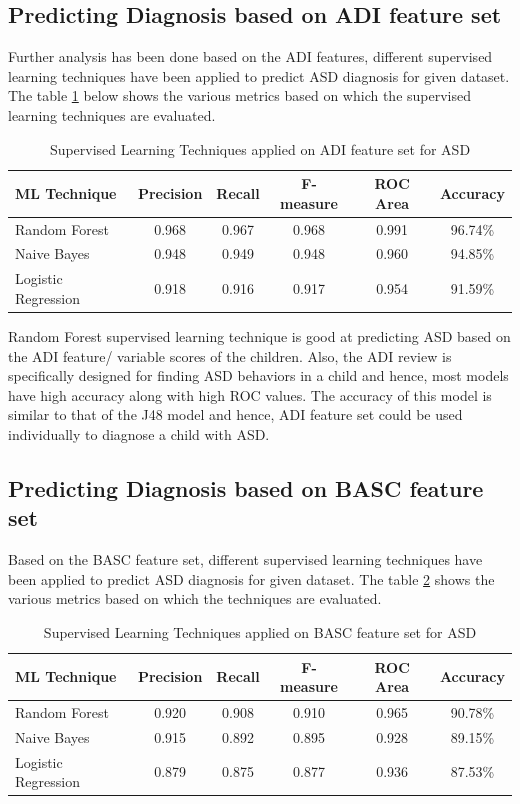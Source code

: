 \subsection{Predicting Diagnosis based on ADI feature set}
Further analysis has been done based on the ADI features, different supervised learning techniques have been applied to predict ASD diagnosis for given dataset. The table \ref{table:64} below shows the various metrics based on which the supervised learning techniques are evaluated.
\begin{table}[h]
\begin{center}
\begin{tabular}{|l|c|c|c|c|c|}
\hline
\textbf{ML Technique}&	\textbf{Precision}&	\textbf{Recall}&	\textbf{F-measure}&	\textbf{ROC Area}&	\textbf{Accuracy}\\
\hline \hline
Random Forest&0.968&	0.967&	0.968&	0.991	&96.74\%\\
\hline
Naive Bayes&	0.948&	0.949&	0.948&	0.960&	94.85\%\\
\hline
Logistic Regression	&0.918&	0.916&	0.917	&0.954&	91.59\%\\
\hline
\end{tabular}
\end{center}
\caption{Supervised Learning Techniques applied on ADI feature set for ASD}
\label{table:64}
\end{table}

Random Forest supervised learning technique is good at predicting ASD based on the ADI feature/ variable scores of the children. Also, the ADI review is specifically designed for finding ASD behaviors in a child and hence, most models have high accuracy along with high ROC values. The accuracy of this model is similar to that of the J48 model and hence, ADI feature set could be used individually to diagnose a child with ASD.

\subsection{Predicting Diagnosis based on BASC feature set}
Based on the BASC feature set, different supervised learning techniques have been applied to predict ASD diagnosis for given dataset. The table \ref{table:65} shows the various metrics based on which the techniques are evaluated.
\begin{table}[h]
\begin{center}
\begin{tabular}{|l|c|c|c|c|c|}
\hline
\textbf{ML Technique}&	\textbf{Precision}&	\textbf{Recall}&	\textbf{F-measure}&	\textbf{ROC Area}&	\textbf{Accuracy}\\
\hline \hline
Random Forest&0.920	&0.908&	0.910	&0.965&	90.78\%\\
\hline Naive Bayes&	0.915&	0.892&	0.895&	0.928&	89.15\%\\
\hline
Logistic Regression	&0.879	&0.875&	0.877	&0.936&	87.53\%\\
\hline
\end{tabular}
\end{center}
\caption{Supervised Learning Techniques applied on BASC feature set for ASD}
\label{table:65}
\end{table}

